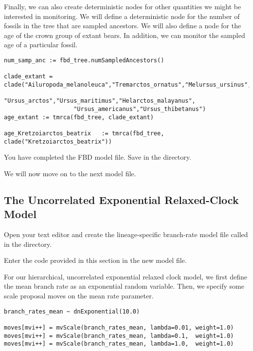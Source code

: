 Finally, we can also create deterministic nodes for other quantities we might be interested in monitoring. 
We will define a deterministic node for the number of fossils in the tree that are sampled ancestors. 
We will also define a node for the age of the crown group of extant bears.
In addition, we can monitor the sampled age of a particular fossil.

{\tt \begin{snugshade*}
\begin{lstlisting}
num_samp_anc := fbd_tree.numSampledAncestors()

clade_extant = clade("Ailuropoda_melanoleuca","Tremarctos_ornatus","Melursus_ursinus",
                    "Ursus_arctos","Ursus_maritimus","Helarctos_malayanus",
                    "Ursus_americanus","Ursus_thibetanus")
age_extant := tmrca(fbd_tree, clade_extant)

age_Kretzoiarctos_beatrix   := tmrca(fbd_tree, clade("Kretzoiarctos_beatrix"))
\end{lstlisting}
\end{snugshade*}}

{\begin{framed}
You have completed the FBD model file. Save  in the  directory.

We will now move on to the next model file.
\end{framed}}


\bigskip

\subsection{The Uncorrelated Exponential Relaxed-Clock Model}\label{subsect:RB-ModelUExp}

{\begin{framed}
Open your text editor and create the lineage-specific branch-rate model file called {\textcolor{red}{}} in the  directory.

Enter the \Rev code provided in this section in the new model file.
\end{framed}}

For our hierarchical, uncorrelated exponential relaxed clock model, we first define the mean branch rate as an exponential random variable.
Then, we specify some scale proposal moves on the mean rate parameter.
{\tt \begin{snugshade*}
\begin{lstlisting}
branch_rates_mean ~ dnExponential(10.0)

moves[mvi++] = mvScale(branch_rates_mean, lambda=0.01, weight=1.0)
moves[mvi++] = mvScale(branch_rates_mean, lambda=0.1,  weight=1.0)
moves[mvi++] = mvScale(branch_rates_mean, lambda=1.0,  weight=1.0)
\end{lstlisting}
\end{snugshade*}}

